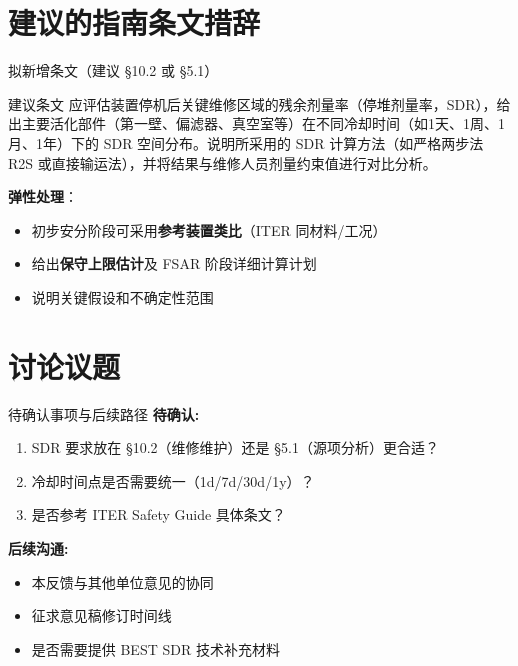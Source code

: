 \documentclass[aspectratio=169]{ctexbeamer}
\begin{document}
\section{建议的指南条文措辞}

\begin{frame}{拟新增条文（建议 §10.2 或 §5.1）}
	\begin{block}{建议条文}
		应评估装置停机后关键维修区域的残余剂量率（停堆剂量率，SDR），给出主要活化部件（第一壁、偏滤器、真空室等）在不同冷却时间（如1天、1周、1月、1年）下的 SDR 空间分布。说明所采用的 SDR 计算方法（如严格两步法 R2S 或直接输运法），并将结果与维修人员剂量约束值进行对比分析。
	\end{block}

	\vspace{8pt}
	\textbf{弹性处理}：
	\begin{itemize}
		\item 初步安分阶段可采用\textbf{参考装置类比}（ITER 同材料/工况）
		\item 给出\textbf{保守上限估计}及 FSAR 阶段详细计算计划
		\item 说明关键假设和不确定性范围
	\end{itemize}
\end{frame}

\section{讨论议题}

\begin{frame}{待确认事项与后续路径}
	\textbf{待确认:}
	\begin{enumerate}
		\item SDR 要求放在 §10.2（维修维护）还是 §5.1（源项分析）更合适？
		\item 冷却时间点是否需要统一（1d/7d/30d/1y）？
		\item 是否参考 ITER Safety Guide 具体条文？
	\end{enumerate}

	\vspace{12pt}
	\textbf{后续沟通:}
	\begin{itemize}
		\item 本反馈与其他单位意见的协同
		\item 征求意见稿修订时间线
		\item 是否需要提供 BEST SDR 技术补充材料
	\end{itemize}
\end{frame}
\end{document}
